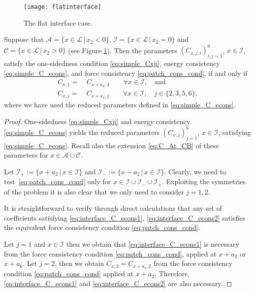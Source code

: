\documentclass[12pt, reqno, a4paper]{amsart}
\numberwithin{equation}{section}
\numberwithin{theorem}{section}
\numberwithin{remark}{section}
\begin{document}
\begin{figure}
  \begin{center}
   \texttt{[image: flatinterface]}
   \end{center}
   \caption{The flat interface case.}
\label{fig:flatinterface}
\end{figure}

\begin{proposition}
  \label{th:params:flat}
  Suppose that ${\mathcal{A}} = \{ x \in {\mathcal{L}} {\,|\,} x_2 < 0 \}$, ${\mathcal{I}} = \{x \in {\mathcal{L}}
  {\,|\,} x_2 = 0 \}$ and ${\mathcal{C}} = \{ x \in {\mathcal{L}} {\,|\,} x_2 > 0 \}$ (see Figure
  \ref{fig:flatinterface}). Then the parameters $(C_{x,j,i})_{i,j =
    1}^6$, $x \in {\mathcal{I}}$, satisfy the one-sidedness condition
  \eqref{eq:simple_Cxji}, energy consistency
  \eqref{eq:simple_C_econs}, and force consistency
  \eqref{eq:patch_cons_cond}, if and only if
  \begin{align}
    \label{eq:interface_C_econs1}
    C_{x,1} =~& C_{x+a_1, 4} \qquad \forall x \in {\mathcal{I}}, \quad
    \text{and} \\
    \label{eq:interface_C_econs2}
    C_{x,j} =~& C_{x+a_1, j} \qquad \forall x \in {\mathcal{I}}, \quad j \in
    \{2, 3, 5, 6\},
  \end{align}
  where we have used the reduced parameters defined in
  \eqref{eq:simple_C_econs}.
\end{proposition}
\begin{proof}
  One-sidedness \eqref{eq:simple_Cxji} and energy consistency
  \eqref{eq:simple_C_econs} yields the reduced parameters
  $(C_{x,j})_{j = 1}^6$, $x \in {\mathcal{I}}$, satisfying
  \eqref{eq:simple_C_econs}. Recall also the extension
  \eqref{eq:C_At_CB} of these parameters for $x \in {\mathcal{A}} \cup {\mathcal{C}}$. 

  Let ${\mathcal{I}}_+ := \{ x+a_2 {\,|\,} x \in {\mathcal{I}} \}$ and ${\mathcal{I}}_- := \{ x - a_2
  {\,|\,} x \in {\mathcal{I}} \}$. Clearly, we need to
  test~\eqref{eq:patch_cons_cond} only for $x \in {\mathcal{I}} \cup {\mathcal{I}}_- \cup
  {\mathcal{I}}_+$. Exploiting the symmetries of the problem it is also clear
  that we only need to consider $j = 1, 2$.

  It is straightforward to verify through direct calculations that any
  set of coefficients satisfying \eqref{eq:interface_C_econs1},
  \eqref{eq:interface_C_econs2} satisfies the equivalent force
  consistency condition \eqref{eq:patch_cons_cond}. 
  
  Let $j=1$ and $x\in{\mathcal{I}}$ then we obtain that
  \eqref{eq:interface_C_econs1} is necessary from the force
  consistency condition \eqref{eq:patch_cons_cond}, applied at $x+a_2$
  or $x+a_6$. Let $j=2$, then we obtain $C_{x,2}=C_{x+a_1,2}$ from the
  force consistency condition \eqref{eq:patch_cons_cond} applied at
  $x+a_2$.  Therefore, \eqref{eq:interface_C_econs1} and
  \eqref{eq:interface_C_econs2} are also necessary.
\end{proof}
\end{document}
